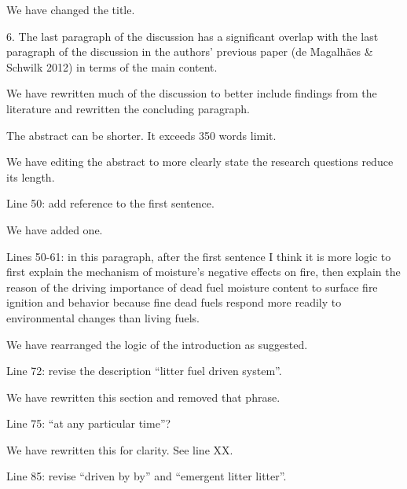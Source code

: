 \documentclass[letterpaper, 12pt]{letter}
\begin{document}
\begin{letter}{}
We have changed the title.

\begin{quoting}
  6. The last paragraph of the discussion has a significant overlap with the
  last paragraph of the discussion in the authors’ previous paper (de Magalhães
  \& Schwilk 2012) in terms of the main content.
\end{quoting}

We have rewritten much of the discussion to better include findings from the
literature and rewritten the concluding paragraph.

\begin{quoting}
The abstract can be shorter. It exceeds 350 words limit. 
\end{quoting}

We have editing the abstract to more clearly state the research questions
reduce its length.

\begin{quoting}
Line 50: add reference to the first sentence.
\end{quoting}

We have added one.

\begin{quoting}
  Lines 50-61: in this paragraph, after the first sentence I think it is more
  logic to first explain the mechanism of moisture’s negative effects on fire,
  then explain the reason of the driving importance of dead fuel moisture
  content to surface fire ignition and behavior because fine dead fuels respond
  more readily to environmental changes than living fuels.
\end{quoting}

We have rearranged the logic of the introduction as suggested.

\begin{quoting}
Line 72: revise the description ``litter fuel driven system''.
\end{quoting}

We have rewritten this section and removed that phrase.

\begin{quoting}
Line 75: “at any particular time”?
\end{quoting}

We have rewritten this for clarity. See line XX.

\begin{quoting}
Line 85: revise ``driven by by'' and ``emergent litter litter''.
\end{quoting}


\end{letter}
\end{document}
